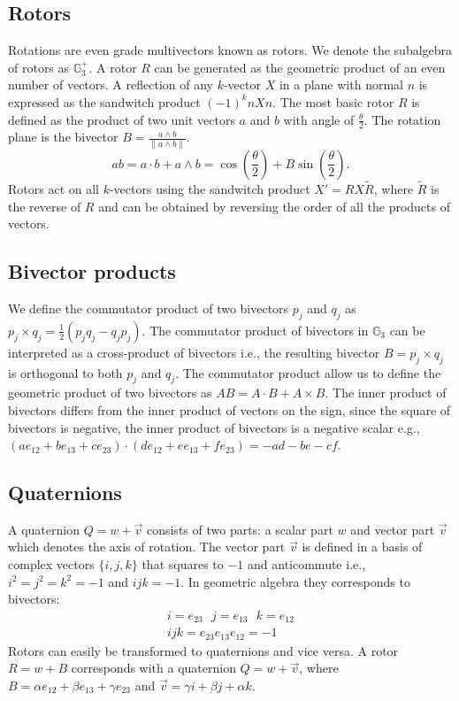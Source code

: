 \documentclass{birkjour}
\numberwithin{equation}{section}
\begin{document}
\subsection{Rotors}

Rotations are even grade multivectors known as rotors. We denote the subalgebra of rotors as $\mathbb{G}^{+}_3$. A rotor $R$ can be generated as the geometric product of an even number of vectors. A reflection of any $k$-vector $X$ in a plane with normal $n$ is expressed as the sandwitch product $(-1)^k n X n$. The most basic rotor $R$ is defined as the product of two unit vectors $a$ and $b$ with angle of $\frac{\theta}{2}$. The rotation plane is the bivector $B = \frac{a \wedge b}{\| a \wedge b \|}$.
\begin{equation}
a b = a \cdot b + a \wedge b = \cos\left( \frac{\theta}{2} \right) + B \sin\left( \frac{\theta}{2} \right).
\end{equation}
Rotors act on all $k$-vectors using the sandwitch product $X' = R X \tilde R$, where $\tilde R$ is the reverse of $R$ and can be obtained by reversing the order of all the products of vectors.

\subsection{Bivector products}

We define the commutator product of two bivectors $p_j$ and $q_j$ as $p_j \times q_j = \frac{1}{2}(p_j q_j - q_j p _j)$. The commutator product of bivectors in $\mathbb{G}_3$  can be interpreted as a cross-product of bivectors i.e., the resulting bivector $B = p_j \times q_j$ is orthogonal to both $p_j$ and $q_j$. The commutator product allow us to define the geometric product of two bivectors as $A B = A \cdot B + A \times B$. The inner product of bivectors differs from the inner product of vectors on the sign, since the square of bivectors is negative, the inner product of bivectors is a negative scalar e.g., $(a e_{12} + b e_{13} + c e_{23}) \cdot (d e_{12} + e e_{13} + f e_{23}) = -a d - b e - c f$.

\subsection{Quaternions}

A quaternion $Q = w + \vec v$ consists of two parts: a scalar part $w$ and vector part $\vec v$ which denotes the axis of rotation. The vector part $\vec v$ is defined in a basis of complex vectors $\{ i, j, k \}$ that squares to $-1$ and anticommute i.e., $i^2 = j^2 = k^2 = -1$ and $i j k = -1$. In geometric algebra they corresponds to bivectors:
\begin{eqnarray}
i = e_{23} \ \ \ j = e_{13} \ \ \  k = e_{12} \\
ijk = e_{23} e_{13} e_{12} = -1 \nonumber
\end{eqnarray}
Rotors can easily be transformed to quaternions and vice versa. A rotor $R = w + B$ corresponds with a quaternion $Q = w + \vec v$, where $B = \alpha e_{12} + \beta e_{13} + \gamma e_{23}$ and $\vec v = \gamma i + \beta j + \alpha k$.
\end{document}
